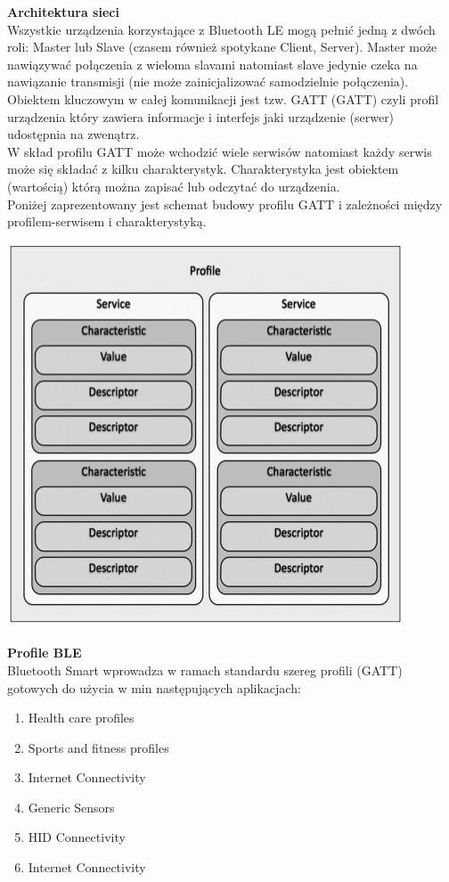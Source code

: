 \par
\tab \textbf{Architektura sieci} \\ 
Wszystkie urządzenia korzystające z Bluetooth LE mogą pełnić jedną z dwóch roli: Master lub Slave (czasem również spotykane Client, Server). Master może nawiązywać połączenia z wieloma slavami natomiast slave jedynie czeka na nawiązanie transmisji (nie może zainicjalizować samodzielnie połączenia). \\
Obiektem kluczowym w całej komunikacji jest tzw. GATT (GATT)  czyli profil urządzenia który zawiera informacje i interfejs jaki urządzenie (serwer) udostępnia na zwenątrz. \\
W skład profilu GATT może wchodzić wiele serwisów natomiast każdy serwis może się składać z kilku charakterystyk. Charakterystyka jest obiektem (wartością) którą można zapisać lub odczytać do urządzenia.\\
Poniżej zaprezentowany jest schemat budowy profilu GATT i zależności między profilem-serwisem i charakterystyką. \\

\centerline{\includegraphics[scale=0.5]{./img/GATT_char_ble.jpg}}

\par
\tab \textbf{Profile BLE} \\
Bluetooth Smart wprowadza w ramach standardu szereg profili (GATT) gotowych do użycia w min następujących aplikacjach:
\begin{enumerate}
	\item Health care profiles
	\item Sports and fitness profiles
	\item Internet Connectivity
	\item Generic Sensors
	\item HID Connectivity
	\item Internet Connectivity
\end{enumerate}  


\clearpage